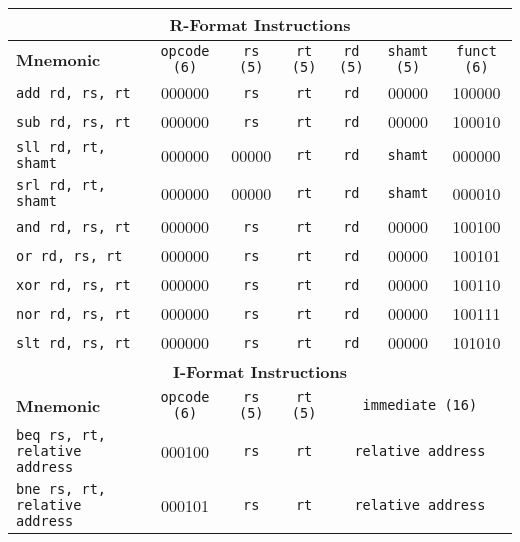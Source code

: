 \documentclass[a4paper, 10pt]{article}
\begin{document}
\begin{table}[ht]
    \centering
    \renewcommand{\arraystretch}{1.2}
    \begin{tabularx}{\textwidth}{|X|c|c|c|c|c|c|}
        \hline
        \multicolumn{7}{|c|}{\textbf{R-Format Instructions}} \\ \hline
        \textbf{Mnemonic} & \texttt{opcode (6)} & \texttt{rs (5)} & \texttt{rt (5)} & \texttt{rd (5)} & \texttt{shamt (5)} & \texttt{funct (6)} \\ \hline
        \texttt{add rd, rs, rt}    & 000000 & \texttt{rs}    & \texttt{rt}    & \texttt{rd}    & 00000 & 100000 \\ \hline
        \texttt{sub rd, rs, rt}    & 000000 & \texttt{rs}    & \texttt{rt}    & \texttt{rd}    & 00000 & 100010 \\ \hline
        \texttt{sll rd, rt, shamt} & 000000 & 00000         & \texttt{rt}    & \texttt{rd}    & \texttt{shamt} & 000000 \\ \hline
        \texttt{srl rd, rt, shamt} & 000000 & 00000         & \texttt{rt}    & \texttt{rd}    & \texttt{shamt} & 000010 \\ \hline
        \texttt{and rd, rs, rt}    & 000000 & \texttt{rs}    & \texttt{rt}    & \texttt{rd}    & 00000 & 100100 \\ \hline
        \texttt{or rd, rs, rt}     & 000000 & \texttt{rs}    & \texttt{rt}    & \texttt{rd}    & 00000 & 100101 \\ \hline
        \texttt{xor rd, rs, rt}    & 000000 & \texttt{rs}    & \texttt{rt}    & \texttt{rd}    & 00000 & 100110 \\ \hline
        \texttt{nor rd, rs, rt}    & 000000 & \texttt{rs}    & \texttt{rt}    & \texttt{rd}    & 00000 & 100111 \\ \hline
        \texttt{slt rd, rs, rt}    & 000000 & \texttt{rs}    & \texttt{rt}    & \texttt{rd}    & 00000 & 101010 \\ \hline
        \multicolumn{7}{|c|}{\textbf{I-Format Instructions}} \\ \hline
        \textbf{Mnemonic} & \texttt{opcode (6)} & \texttt{rs (5)} & \texttt{rt (5)} & \multicolumn{3}{c|}{\texttt{immediate (16)}} \\ \hline
        \texttt{beq rs, rt, relative address}   & 000100 & \texttt{rs}   & \texttt{rt}   & \multicolumn{3}{c|}{\texttt{relative address}}  \\ \hline
        \texttt{bne rs, rt, relative address}   & 000101 & \texttt{rs}   & \texttt{rt}   & \multicolumn{3}{c|}{\texttt{relative address}} \\ \hline

\end{tabularx}
\end{table}
\end{document}

